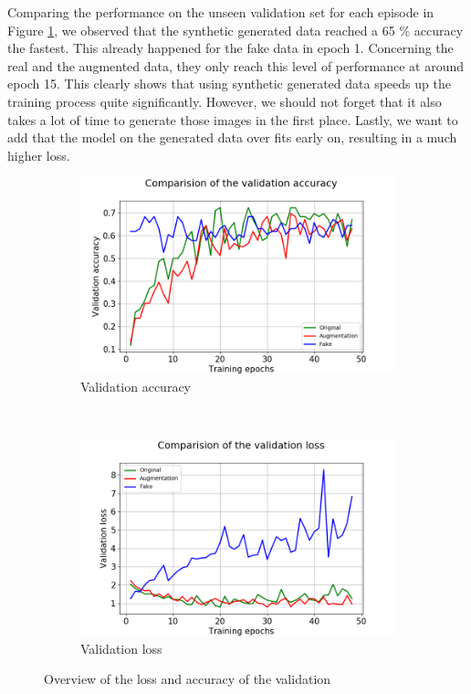 \documentclass[13pt]{article}
\begin{document}
Comparing the performance on the unseen validation set for each episode in Figure \ref{fruits_validation}, we observed that the synthetic generated data reached a 65 \% accuracy the fastest. This already happened for the fake data in epoch 1. Concerning the real and the augmented data, they only reach this level of performance at around epoch 15. This clearly shows that using synthetic generated data speeds up the training process quite significantly. However, we should not forget that it also takes a lot of time to generate those images in the first place. Lastly, we want to add that the model on the generated data over fits early on, resulting in a much higher loss.

\begin{figure}[h!]
    \centering
    \begin{subfigure}[b]{0.48\textwidth}
        \includegraphics[width=\textwidth]{plots/fruits/comparision_val_acc.png}
        \caption{Validation accuracy}
    \end{subfigure}
    ~ 
    \begin{subfigure}[b]{0.48\textwidth}
        \includegraphics[width=\textwidth]{plots/fruits/comparision_val_loss.png}
        \caption{Validation loss}
    \end{subfigure}
    \caption{Overview of the loss and accuracy of the validation}
    \label{fruits_validation}
\end{figure}
\end{document}
